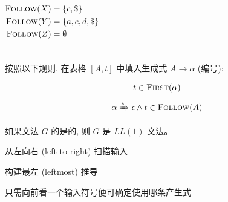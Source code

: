 \begin{frame}{}
  \begin{columns}
      
      \pause
      \begin{align*}
        \textsc{Follow}(X) &= \{c, \$\} \\
        \textsc{Follow}(Y) &= \{a, c, d, \$\} \\
        \textsc{Follow}(Z) &= \emptyset
      \end{align*}
  \end{columns}
\end{frame}

\begin{frame}{}
  \begin{center}

    \vspace{0.80cm}

    按照以下规则, 在表格 $[A, t]$ 中填入生成式 $A \to \alpha$ (编号):

    \begin{gather}
      t \in \textsc{First}(\alpha) \\[6pt]
      \alpha \xRightarrow[]{\ast} \epsilon \land t \in \textsc{Follow}(A)
    \end{gather}

    \pause
    \begin{definition}[$LL(1)$文法]
      如果文法 $G$ 的是的,
      则 $G$ 是 $LL(1)$ 文法。
    \end{definition}
  \end{center}
\end{frame}

\begin{frame}{}
  \begin{center}
    {\large {}}

    \vspace{0.80cm}
    \begin{description}
      \setlength{\itemsep}{12pt}
      \item[$L:$] 从左向右 (left-to-right) 扫描输入
      \item[$L:$] 构建最左 (leftmost) 推导
      \item[$1:$] 只需向前看一个输入符号便可确定使用哪条产生式
    \end{description}
  \end{center}
\end{frame}

